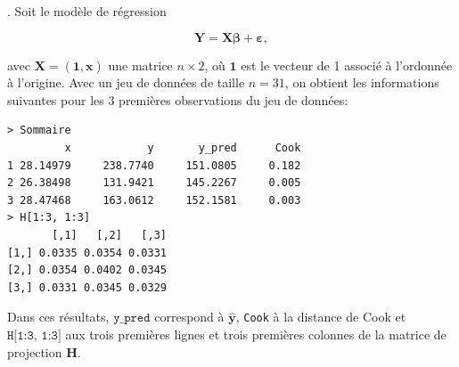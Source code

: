 \begin{questions}

\newpage
.
\newpage
\question\label{cook} Soit le modèle de régression

$$\boldsymbol{Y}=\boldsymbol{X\beta}+\boldsymbol{\varepsilon},$$

avec $\boldsymbol{X}=(\boldsymbol{1}, \boldsymbol{x})$ une matrice $n\times 2$, où $\boldsymbol{1}$ est le vecteur de 1 associé à l'ordonnée à l'origine.
Avec un jeu de données de taille $n=31$, on obtient les informations suivantes pour les $3$ premières observations du jeu de données:
\begin{verbatim}
> Sommaire
         x            y       y_pred      Cook
1 28.14979     238.7740     151.0805     0.182
2 26.38498     131.9421     145.2267     0.005
3 28.47468     163.0612     152.1581     0.003
> H[1:3, 1:3]
       [,1]   [,2]   [,3]
[1,] 0.0335 0.0354 0.0331
[2,] 0.0354 0.0402 0.0345
[3,] 0.0331 0.0345 0.0329
\end{verbatim}

Dans ces résultats, $\texttt{y\_pred}$ correspond à $\boldsymbol{\widehat{y}}$, \texttt{Cook} à la distance de Cook et $\texttt{H[1:3, 1:3]}$ aux trois premières lignes et trois premières colonnes de la matrice de projection $\boldsymbol{H}$.

\vspace{0.5cm}
\end{questions}
